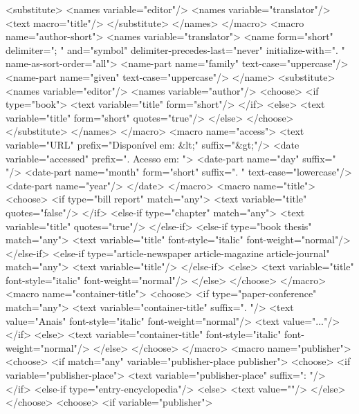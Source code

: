       <substitute>
        <names variable="editor"/>
        <names variable="translator"/>
        <text macro="title"/>
      </substitute>
    </names>
  </macro>
  <macro name="author-short">
    <names variable="translator">
      <name form="short" delimiter="; " and="symbol" delimiter-precedes-last="never" initialize-with=". " name-as-sort-order="all">
        <name-part name="family" text-case="uppercase"/>
        <name-part name="given" text-case="uppercase"/>
      </name>
      <substitute>
        <names variable="editor"/>
        <names variable="author"/>
        <choose>
          <if type="book">
            <text variable="title" form="short"/>
          </if>
          <else>
            <text variable="title" form="short" quotes="true"/>
          </else>
        </choose>
      </substitute>
    </names>
  </macro>
  <macro name="access">
    <text variable="URL" prefix="Disponível em: &lt;" suffix="&gt;"/>
    <date variable="accessed" prefix=". Acesso em: ">
      <date-part name="day" suffix=" "/>
      <date-part name="month" form="short" suffix=". " text-case="lowercase"/>
      <date-part name="year"/>
    </date>
  </macro>
  <macro name="title">
    <choose>
      <if type="bill report" match="any">
        <text variable="title" quotes="false"/>
      </if>
      <else-if type="chapter" match="any">
        <text variable="title" quotes="true"/>
      </else-if>
      <else-if type="book thesis" match="any">
        <text variable="title" font-style="italic" font-weight="normal"/>
      </else-if>
      <else-if type="article-newspaper article-magazine article-journal" match="any">
        <text variable="title"/>
      </else-if>
      <else>
        <text variable="title" font-style="italic" font-weight="normal"/>
      </else>
    </choose>
  </macro>
  <macro name="container-title">
    <choose>
      <if type="paper-conference" match="any">
        <text variable="container-title" suffix=". "/>
        <text value="Anais" font-style="italic" font-weight="normal"/>
        <text value="..."/>
      </if>
      <else>
        <text variable="container-title" font-style="italic" font-weight="normal"/>
      </else>
    </choose>
  </macro>
  <macro name="publisher">
    <choose>
      <if match="any" variable="publisher-place publisher">
        <choose>
          <if variable="publisher-place">
            <text variable="publisher-place" suffix=": "/>
          </if>
          <else-if type="entry-encyclopedia"/>
          <else>
            <text value=""/>
          </else>
        </choose>
        <choose>
          <if variable="publisher">
